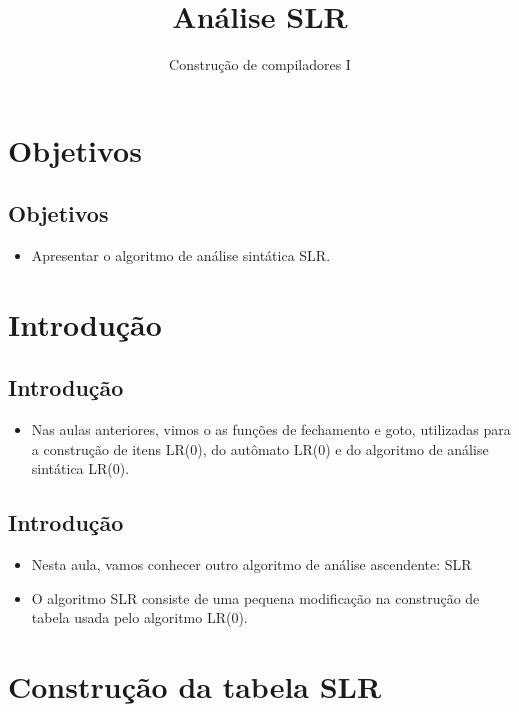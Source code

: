 \documentclass[11pt]{article}
\author{Construção de compiladores I}
\date{}
\title{Análise SLR}
\begin{document}
\maketitle
\section*{Objetivos}
\label{sec:org5b707d9}

\subsection*{Objetivos}
\label{sec:org5b3ef79}

\begin{itemize}
\item Apresentar o algoritmo de análise sintática SLR.
\end{itemize}
\section*{Introdução}
\label{sec:org84ccf9f}

\subsection*{Introdução}
\label{sec:org00f7c7e}

\begin{itemize}
\item Nas aulas anteriores, vimos o as funções de fechamento e goto,
utilizadas para a construção de itens LR(0), do autômato LR(0)
e do algoritmo de análise sintática LR(0).
\end{itemize}
\subsection*{Introdução}
\label{sec:orgdc28dc4}

\begin{itemize}
\item Nesta aula, vamos conhecer outro algoritmo de análise
ascendente: SLR

\item O algoritmo SLR consiste de uma pequena modificação na construção
de tabela usada pelo algoritmo LR(0).
\end{itemize}
\section*{Construção da tabela SLR}
\label{sec:org6d13c48}
\end{document}

